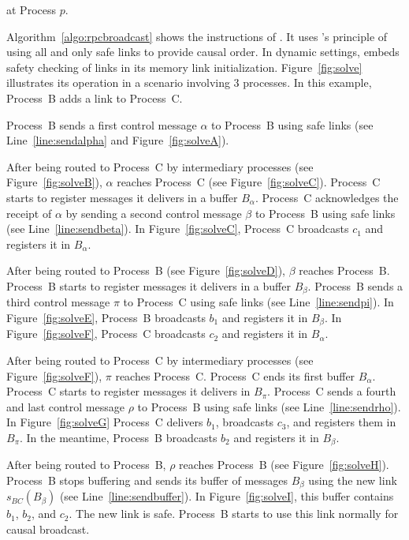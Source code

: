 \begin{algorithm}[h]
  
  \caption{\label{algo:rpcbroadcast}\RPCBROADCAST at Process $p$.}
\end{algorithm}

Algorithm~\ref{algo:rpcbroadcast} shows the instructions of \RPCBROADCAST.  It
uses \PCBROADCAST's principle of using all and only safe links to provide causal
order.  In dynamic settings, \RPCBROADCAST embeds safety checking of links in
its memory link initialization.
Figure~\ref{fig:solve} illustrates its operation in a scenario involving 3
processes. In this example, Process~B adds a link to Process~C.

\noindent Process~B sends a first control message $\alpha$ to Process~B using
safe links (see Line~\ref{line:sendalpha} and Figure~\ref{fig:solveA}).

\noindent After being routed to Process~C by intermediary processes (see
Figure~\ref{fig:solveB}), $\alpha$ reaches Process~C (see
Figure~\ref{fig:solveC}).  Process~C starts to register messages it delivers in
a buffer $B_\alpha$.  Process~C acknowledges the receipt of $\alpha$ by sending
a second control message $\beta$ to Process~B using safe links (see
Line~\ref{line:sendbeta}). In Figure~\ref{fig:solveC}, Process~C broadcasts
$c_1$ and registers it in $B_\alpha$.

\noindent After being routed to Process~B (see Figure~\ref{fig:solveD}), $\beta$
reaches Process~B. Process~B starts to register messages it delivers in a buffer
$B_\beta$. Process~B sends a third control message $\pi$ to Process~C using safe
links (see Line~\ref{line:sendpi}). In Figure~\ref{fig:solveE}, Process~B
broadcasts $b_1$ and registers it in $B_\beta$. In Figure~\ref{fig:solveF},
Process~C broadcasts $c_2$ and registers it in $B_\alpha$.

\noindent After being routed to Process~C by intermediary processes (see
Figure~\ref{fig:solveF}), $\pi$ reaches Process~C. Process~C ends its first
buffer $B_\alpha$.  Process~C starts to register messages it delivers in
$B_\pi$.  Process~C sends a fourth and last control message $\rho$ to Process~B
using safe links (see Line~\ref{line:sendrho}). In Figure~\ref{fig:solveG}
Process~C delivers $b_1$, broadcasts $c_3$, and registers them in $B_\pi$. In
the meantime, Process~B broadcasts $b_2$ and registers it in $B_\beta$.

\noindent After being routed to Process~B, $\rho$ reaches Process~B (see
Figure~\ref{fig:solveH}).  Process~B stops buffering and sends its buffer of
messages $B_\beta$ using the new link $s_{BC}(B_\beta)$ (see
Line~\ref{line:sendbuffer}). In Figure~\ref{fig:solveI}, this buffer contains
$b_1$, $b_2$, and $c_2$. The new link is safe. Process~B starts to use this link
normally for causal broadcast.

